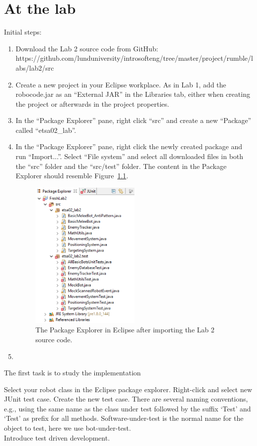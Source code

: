 \documentclass{scrreprt}
\begin{document}
\chapter{At the lab}
Initial steps:
\begin{enumerate}
\item Download the Lab 2 source code from GitHub:\\
https://github.com/lunduniversity/introsofteng/tree/master/project/rumble/labs/lab2/src
\item Create a new project in your Eclipse workplace. As in Lab 1, add the robocode.jar as an ``External JAR'' in the Libraries tab, either when creating the project or afterwards in the project properties.
\item In the ``Package Explorer'' pane, right click ``src'' and create a new ``Package'' called ``etsa02_lab''.
\item In the ``Package Explorer'' pane, right click the newly created package and run ``Import...''. Select ``File system'' and select all downloaded files in both the ``src'' folder and the ``src/test'' folder. The content in the Package Explorer should resemble Figure~\ref{fig:afterImport}.
\begin{figure}
\centering
\includegraphics[width=0.5\textwidth]{figures/packageExplorerAfterImport.png}
\caption{The Package Explorer in Eclipse after importing the Lab 2 source code.}
\label{fig:afterImport}
\end{figure}
\item 
\end{enumerate}

The first task is to study the implementation

Select your robot class in the Eclipse package explorer. Right-click and select new JUnit test case. Create the new test case. There are several naming conventions, e.g., using the same name as the class under test followed by the suffix `Test' and `Test' as prefix for all methods.
Software-under-test is the normal name for the object to test, here we use bot-under-test.\\
Introduce test driven development.
\end{document}

